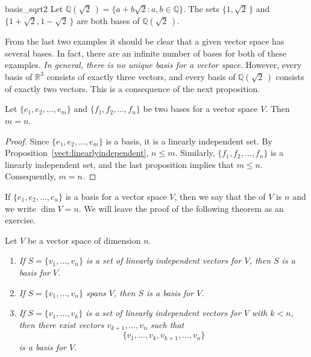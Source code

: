  
 
\begin{example}{basis_sqrt2}
Let ${\mathbb Q}( \sqrt{2}\, ) = \{ a + b \sqrt{2} : a, b \in {\mathbb Q} \}$.
The sets $\{1, \sqrt{2}\,  \}$ and $\{1+\sqrt{2}, 1- \sqrt{2}\,  \}$ are
both bases of ${\mathbb Q}( \sqrt{2}\, )$.  
\end{example}





From the last two examples it should be clear that a given vector
space has several bases. In fact, there are an infinite number of
bases for both of these examples. \emph{In general, there is no unique 
basis for a vector space}.  However, every basis of ${\mathbb R}^3$ consists
of exactly three vectors, and every  basis of ${\mathbb Q}(\sqrt{2}\, )$ 
consists of exactly two vectors. This is a consequence of the next 
proposition.


\begin{proposition}
Let $\{ e_1, e_2, \ldots, e_m \}$ and $\{ f_1, f_2, \ldots, f_n \}$ be
two bases for a vector space $V$. Then $m=n$. 
\end{proposition}


\begin{proof}
Since $\{ e_1, e_2, \ldots, e_m \}$ is a basis, it is a linearly
independent set.  By  Proposition~\ref{vect:linearlyindependent}, $n \leq m$. Similarly, $\{
f_1, f_2, \ldots, f_n \}$ is a linearly independent set, and the last
proposition implies that $m \leq n$.  Consequently, $m =n$.
\mbox{\hspace{1in}}
\end{proof}
 

\medskip
 

If $\{ e_1, e_2, \ldots, e_n \}$ is a basis for a vector space $V$,
then we say that the 
of $V$ is $n$ and we write $\dim V =n$\label{vectdim}. 
We will leave the proof of the following theorem as an exercise.


\begin{theorem}
Let $V$ be a vector space of dimension $n$.
\begin{enumerate}

\rm \item \it
If $S = \{v_1, \ldots, v_n \}$ is a set of linearly independent
vectors for $V$, then $S$ is a basis for $V$. 

\rm \item \it
If $S = \{v_1, \ldots, v_n \}$ spans $V$, then $S$ is a basis for $V$. 

\rm \item \it
If $S = \{v_1, \ldots, v_k \}$ is a set of linearly independent
vectors for $V$ with $k < n$, then there exist vectors $v_{k+1},
\ldots, v_n$ such that  
\[
\{v_1, \ldots, v_k, v_{k+1}, \ldots, v_n \}
\]
is a basis for $V$. 

\end{enumerate}
\end{theorem}


